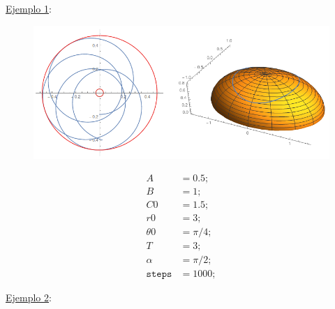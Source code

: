 \documentclass[a4paper,10pt]{article}
\numberwithin{equation}{section}
\begin{document}
\underline{Ejemplo 1}:

\begin{multicols}{2}

\begin{figure}[H]
\center
\includegraphics[scale=0.35]{problema5fig2}
\label{fig:problema5fig2}
\end{figure}

\begin{align*}
 A &= 0.5; \\
 B &= 1; \\
 C0 &= 1.5; \\ 
 r0 &= 3; \\
 \theta 0 &= \pi/4; \\
 T &= 3; \\
 \alpha &= \pi/2; \\ 
 \texttt{steps} &= 1000;
\end{align*}

\end{multicols}

\underline{Ejemplo 2}:
\end{document}
